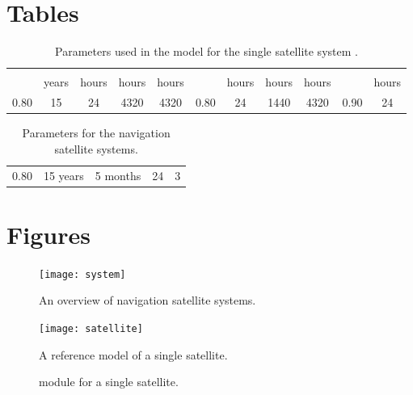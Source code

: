 \documentclass[preprint,12pt]{qrei}
\begin{document}
\section*{Tables}


\begin{table*}[ht]
\centering
\begin{tabular}[l]{@{}ccccccccccc}
\hline
   &  &  &  &  &  &  &  &  &  &  \\
 & years & hours & hours & hours & & hours & hours & hours & & hours\\
\hline
  0.80 & 15 & 24 & 4320 & 4320 & 0.80 & 24 & 1440 & 4320 & 0.90 & 24\\
\hline
\end{tabular}
\caption{Parameters used in the model for the single satellite system .}
\label{tab:one}
\end{table*}

\begin{table*}[ht]
\centering
\begin{tabular}[l]{@{}ccccc}
\hline
   &  &  &  &  \\
\hline
   0.80 & 15 years & 5 months & 24 & 3 \\
\hline
\end{tabular}
\caption{Parameters for the navigation satellite systems.}
\label{tab:two}
\end{table*}


\clearpage

\section*{Figures}

\begin{figure*}[ht]
\begin{center}
\texttt{[image: system]}
\caption{An overview of navigation satellite systems.}
\label{fig:system}
\end{center}
\end{figure*}

\begin{figure*}[ht]
\begin{center}
\texttt{[image: satellite]}
\caption{A reference model of a single satellite.}
\label{fig:model}
\end{center}
\end{figure*}

\begin{figure}[ht]
\begin{center}
\setlength{\fboxrule}{0.5pt} 
\setlength{\fboxsep}{0.25cm} 
\caption{ module for a single satellite.}
\label{fig:code1}
\end{center}
\end{figure}
\end{document}

